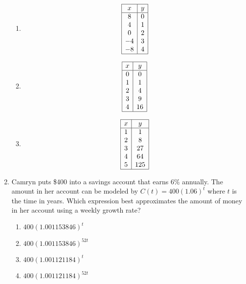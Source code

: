 \documentclass[12pt, twoside]{article}
\begin{document}
\begin{enumerate}[itemsep=0.5cm]
\begin{multicols}{4}
\begin{enumerate}
    \item 
    \[
    \begin{array}{|c|c|}
    \hline
    x & y \\
    \hline
    8 & 0 \\
    4 & 1 \\
    0 & 2 \\
    -4 & 3 \\
    -8 & 4 \\
    \hline
    \end{array}
    \]

    \item 
    \[
    \begin{array}{|c|c|}
    \hline
    x & y \\
    \hline
    0 & 0 \\
    1 & 1 \\
    2 & 4 \\
    3 & 9 \\
    4 & 16 \\
    \hline
    \end{array}
    \]

    \item 
    \[
    \begin{array}{|c|c|}
    \hline
    x & y \\
    \hline
    1 & 1 \\
    2 & 8 \\
    3 & 27 \\
    4 & 64 \\
    5 & 125 \\
    \hline
    \end{array}
    \]
\end{enumerate}
\end{multicols}

\item Camryn puts \$400 into a savings account that earns 6\% annually. The amount in her account can be modeled by \( C(t) = 400(1.06)^t \) where \( t \) is the time in years. Which expression best approximates the amount of money in her account using a weekly growth rate?
\begin{enumerate}
    \item \( 400(1.001153846)^t \)
    \item \( 400(1.001153846)^{52t} \)
    \item \( 400(1.001121184)^t \)
    \item \( 400(1.001121184)^{52t} \)
\end{enumerate}


\end{enumerate}
\end{document}

